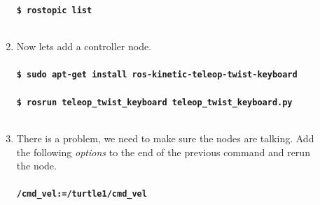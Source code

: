 \documentclass[12pt]{article}
\begin{document}
\begin{description}
\begin{enumerate}
			{\bf \texttt{\$ rostopic list} }\\ \\
			
			\item Now lets add a controller node.\\\\
			
			
			{\bf \texttt{\$ sudo apt-get install ros-kinetic-teleop-twist-keyboard}}\\\\
			
			{\bf \texttt{\$ rosrun teleop\_twist\_keyboard teleop\_twist\_keyboard.py }}\\\\
			
			\item There is a problem, we need to make sure the nodes are talking. Add the following {\it options} to the end of the previous command and rerun the node. \\\\
			
			{\bf \texttt{/cmd\_vel:=/turtle1/cmd\_vel }}\\\\
			
        \end{enumerate}  
\end{description}
\end{document}
